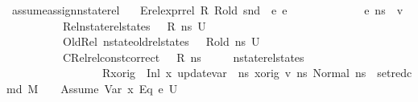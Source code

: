 \begin{isabellebody}
\isanewline
{}\isamarkupfalse%
\ assume{\isacharunderscore}{\kern0pt}assign{\isacharunderscore}{\kern0pt}nstate{\isacharunderscore}{\kern0pt}rel{\isacharcolon}{\kern0pt}\isanewline
\ \ \ Erel{\isacharcolon}{\kern0pt}{\isachardoublequoteopen}expr{\isacharunderscore}{\kern0pt}rel\ R\ R{\isacharunderscore}{\kern0pt}old\ {\isacharparenleft}{\kern0pt}snd\ {\isasymLambda}{\isacharparenright}{\kern0pt}\ e{}\ e{}{\isachardoublequoteclose}\ \isanewline
\ \ \ \ \ \ \ \ \ \ {\isachardoublequoteopen}{\isasymLambda}{\isacharcomma}{\kern0pt}{\isasymGamma}{\isacharcomma}{\kern0pt}{\isasymOmega}\ {\isasymturnstile}\ {\isasymlangle}e{}{\isacharcomma}{\kern0pt}\ ns{\isasymrangle}\ {\isasymDown}\ v{\isachardoublequoteclose}\ \isanewline
\ \ \ \ \ \ \ \ \ \ Rel{\isacharcolon}{\kern0pt}{\isachardoublequoteopen}nstate{\isacharunderscore}{\kern0pt}rel{\isacharunderscore}{\kern0pt}states\ {\isasymLambda}\ {\isasymLambda}{\isacharprime}{\kern0pt}\ R\ ns\ U{\isachardoublequoteclose}\ \isanewline
\ \ \ \ \ \ \ \ \ \ OldRel{\isacharcolon}{\kern0pt}\ {\isachardoublequoteopen}nstate{\isacharunderscore}{\kern0pt}old{\isacharunderscore}{\kern0pt}rel{\isacharunderscore}{\kern0pt}states\ {\isasymLambda}\ {\isasymLambda}{\isacharprime}{\kern0pt}\ R{\isacharunderscore}{\kern0pt}old\ ns\ U{\isachardoublequoteclose}\ \isanewline
\ \ \ \ \ \ \ \ \ \ CRel{\isacharcolon}{\kern0pt}{\isachardoublequoteopen}rel{\isacharunderscore}{\kern0pt}const{\isacharunderscore}{\kern0pt}correct\ {\isasymLambda}\ {\isasymOmega}\ R\ ns{\isachardoublequoteclose}\isanewline
\ \ \ \ \ {\isachardoublequoteopen}nstate{\isacharunderscore}{\kern0pt}rel{\isacharunderscore}{\kern0pt}states\ \isanewline
\ \ \ \ \ \ \ \ \ \ \ \ \ \ \ {\isasymLambda}\ {\isasymLambda}{\isacharprime}{\kern0pt}\ {\isacharparenleft}{\kern0pt}R{\isacharparenleft}{\kern0pt}x{\isacharunderscore}{\kern0pt}orig\ {\isasymmapsto}\ {\isacharparenleft}{\kern0pt}Inl\ x{\isacharparenright}{\kern0pt}{\isacharparenright}{\kern0pt}{\isacharparenright}{\kern0pt}\ {\isacharparenleft}{\kern0pt}update{\isacharunderscore}{\kern0pt}var\ {\isasymLambda}\ ns\ x{\isacharunderscore}{\kern0pt}orig\ v{\isacharparenright}{\kern0pt}\ {\isacharbraceleft}{\kern0pt}ns{\isacharprime}{\kern0pt}{\isachardot}{\kern0pt}\ Normal\ ns{\isacharprime}{\kern0pt}\ {\isasymin}\ {\isacharparenleft}{\kern0pt}set{\isacharunderscore}{\kern0pt}red{\isacharunderscore}{\kern0pt}cmd\ M\ {\isasymLambda}{\isacharprime}{\kern0pt}\ {\isasymGamma}\ {\isasymOmega}\ {\isacharparenleft}{\kern0pt}Assume\ {\isacharparenleft}{\kern0pt}{\isacharparenleft}{\kern0pt}Var\ x{\isacharparenright}{\kern0pt}\ {\isasymguillemotleft}Eq{\isasymguillemotright}\ e{}{\isacharparenright}{\kern0pt}{\isacharparenright}{\kern0pt}\ U{\isacharparenright}{\kern0pt}{\isacharbraceright}{\kern0pt}{\isachardoublequoteclose}\ \isanewline

\end{isabellebody}
